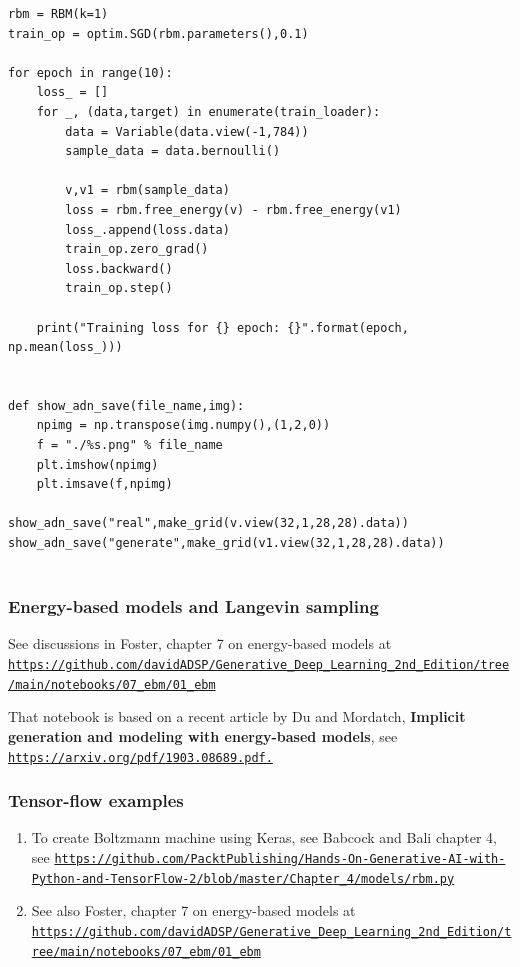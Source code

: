 \documentclass{beamer}
\begin{document}
\begin{frame}
\begin{verbatim}
rbm = RBM(k=1)
train_op = optim.SGD(rbm.parameters(),0.1)

for epoch in range(10):
    loss_ = []
    for _, (data,target) in enumerate(train_loader):
        data = Variable(data.view(-1,784))
        sample_data = data.bernoulli()
        
        v,v1 = rbm(sample_data)
        loss = rbm.free_energy(v) - rbm.free_energy(v1)
        loss_.append(loss.data)
        train_op.zero_grad()
        loss.backward()
        train_op.step()

    print("Training loss for {} epoch: {}".format(epoch, np.mean(loss_)))


def show_adn_save(file_name,img):
    npimg = np.transpose(img.numpy(),(1,2,0))
    f = "./%s.png" % file_name
    plt.imshow(npimg)
    plt.imsave(f,npimg)

show_adn_save("real",make_grid(v.view(32,1,28,28).data))
show_adn_save("generate",make_grid(v1.view(32,1,28,28).data))


\end{verbatim}
\end{frame}

\begin{frame}
\frametitle{Energy-based models and Langevin sampling}

See discussions in Foster, chapter 7 on energy-based models at \href{{https://github.com/davidADSP/Generative_Deep_Learning_2nd_Edition/tree/main/notebooks/07_ebm/01_ebm}}{\nolinkurl{https://github.com/davidADSP/Generative_Deep_Learning_2nd_Edition/tree/main/notebooks/07_ebm/01_ebm}}

That notebook is based on a recent article by Du and Mordatch, \textbf{Implicit generation and modeling with energy-based models}, see \href{{https://arxiv.org/pdf/1903.08689.pdf.}}{\nolinkurl{https://arxiv.org/pdf/1903.08689.pdf.}}
\end{frame}

\begin{frame}
\frametitle{Tensor-flow examples}

\begin{enumerate}
\item To create Boltzmann machine using Keras, see Babcock and Bali chapter 4, see \href{{https://github.com/PacktPublishing/Hands-On-Generative-AI-with-Python-and-TensorFlow-2/blob/master/Chapter_4/models/rbm.py}}{\nolinkurl{https://github.com/PacktPublishing/Hands-On-Generative-AI-with-Python-and-TensorFlow-2/blob/master/Chapter_4/models/rbm.py}}

\item See also Foster, chapter 7 on energy-based models at \href{{https://github.com/davidADSP/Generative_Deep_Learning_2nd_Edition/tree/main/notebooks/07_ebm/01_ebm}}{\nolinkurl{https://github.com/davidADSP/Generative_Deep_Learning_2nd_Edition/tree/main/notebooks/07_ebm/01_ebm}}
\end{enumerate}

\noindent
\end{frame}
\end{document}
